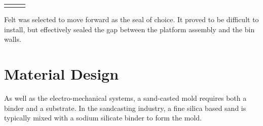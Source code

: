 \documentclass[11pt]{article}
\begin{document}
\begin{itemize}
\begin{table}[htb!]
\begin{center}
\begin{tabular}{ p{2.5cm} || p{5.25cm} | p{4.75cm} }
\begin{minipage}[t]{1\textwidth}
\end{minipage} \\
\end{tabular}
\end{center}
\end{table}

Felt was selected to move forward as the seal of choice. It proved to be difficult to install, but effectively sealed the gap between the platform assembly and the bin walls.

\end{itemize}

\newpage

\newpage
\section{Material Design}
As well as the electro-mechanical systems, a sand-casted mold requires both a binder and a substrate. In the sandcasting industry, a fine silica based sand is typically mixed with a sodium silicate binder to form the mold. 
\end{document}
